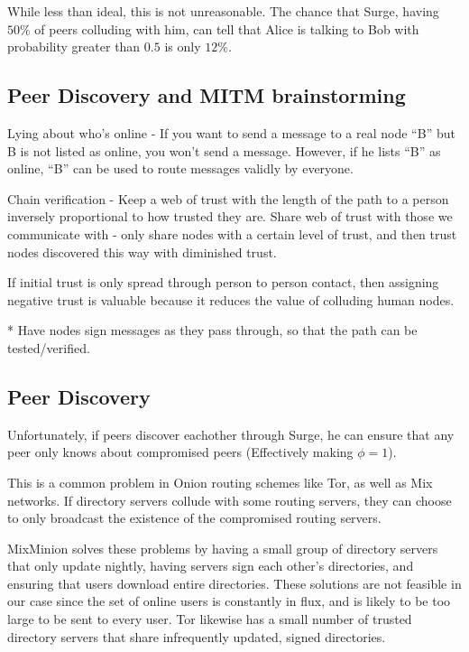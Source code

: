 \documentclass[twocolumn,11pt,english]{paper}
\begin{document}
While less than ideal, this is not unreasonable. The chance that Surge, having $50\%$ of peers colluding with him, can tell that Alice is talking to Bob with probability greater than $0.5$ is only $12\%$. 

\begin{comment}
  TODO: Apply PIR to obtain security guarantees even when $R \subset S$
\end{comment}

\subsection{Peer Discovery and MITM brainstorming}

Lying about who's online - If you want to send a message to a real node ``B'' but B is not listed as online, you won't send a message. However, if he lists ``B'' as online, ``B'' can be used to route messages validly by everyone. 

Chain verification - Keep a web of trust with the length of the path to a person inversely proportional to how trusted they are. Share web of trust with those we communicate with - only share nodes with a certain level of trust, and then trust nodes discovered this way with diminished trust. 

If initial trust is only spread through person to person contact, then assigning negative trust is valuable because it reduces the value of colluding human nodes. 

* Have nodes sign messages as they pass through, so that the path can be tested/verified. 

\subsection{Peer Discovery}
Unfortunately, if peers discover eachother through Surge, he can ensure that any peer only knows about compromised peers (Effectively making $\phi = 1$).

This is a common problem in Onion routing schemes like Tor, as well as Mix networks. If directory servers collude with some routing servers, they can choose to only broadcast the existence of the compromised routing servers.

MixMinion \cite{minion-design} solves these problems by having a small group of directory servers that only update nightly, having servers sign each other's directories, and ensuring that users download entire directories. These solutions are not feasible in our case since the set of online users is constantly in flux, and is likely to be too large to be sent to every user. Tor \cite{tor-design} likewise has a small number of trusted directory servers that share infrequently updated, signed directories.
\end{document}
